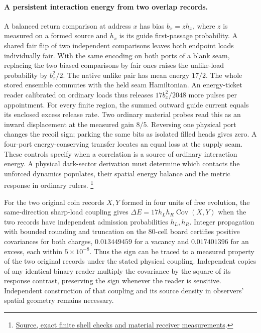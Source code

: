 \documentclass[11pt]{article}
\begin{document}
\paragraph{A persistent interaction energy from two overlap records.}
A balanced return comparison at address $x$ has bias $b_x=z h_x$,
where $z$ is measured on a formed source and $h_x$ is its guide
first-passage probability. A shared fair flip of two independent
comparisons leaves both endpoint loads individually fair. With the
same encoding on both ports of a blank seam, replacing the two biased
comparisons by fair ones raises the unlike-load probability by
$b_x^2/2$. The native unlike pair has mean energy $17/2$.
The whole stored ensemble commutes with the held seam Hamiltonian.
An energy-ticket reader calibrated on ordinary loads thus releases
$17 b_x^2/2048$ more pulses per appointment. For every finite region,
the summed outward guide current equals its enclosed excess release
rate. Two ordinary material probes read this as an inward displacement
at the measured gain $8/5$. Reversing one physical port
changes the recoil sign; parking the same bits as isolated filled
heads gives zero. A four-port energy-conserving transfer locates an
equal loss at the supply seam. These controls specify when a
correlation is a source of ordinary interaction energy. A physical
dark-sector derivation must determine which contacts the
unforced dynamics populates, their spatial energy balance and the
metric response in ordinary rulers.%
\footnote{\href{https://github.com/FloatingPragma/observer-patch-holography/tree/main/model/experiments/interval_echo_shell_flux/product_address/green_response/material_recoil/overlap_source}{Source, exact finite shell checks and material receiver measurements}.}

For the two original coin records $X,Y$ formed in four units of
free evolution, the same-direction sharp-load coupling gives
$\Delta E=17h_Lh_R\operatorname{Cov}(X,Y)$ when the two records have
independent admission probabilities $h_L,h_R$. Integer propagation
with bounded rounding and truncation on the 80-cell board certifies
positive covariances for both charges, $0.013449459$ for a vacancy and
$0.017401396$ for an excess, each within $5\times10^{-8}$. Thus the sign
can be traced to a measured property of the two original records under
the stated physical coupling. Independent copies of any identical
binary reader multiply the covariance by the square of its response
contrast, preserving the sign whenever the reader is sensitive.
Independent construction of that coupling
and its source density in observers' spatial geometry remains necessary.
\end{document}
